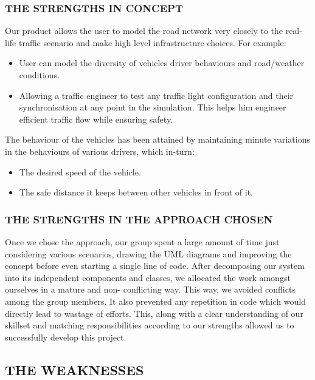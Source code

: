 \documentclass[11pt,a4paper]{article}
\begin{document}
\subsubsection{THE STRENGTHS IN CONCEPT}

Our product allows the user to model the road network very closely to the real-life traffic scenario and make high level infrastructure choices. 
For example:	
\begin{itemize}
\item User can model the diversity of vehicles driver behaviours and road/weather conditions.
\item Allowing a traffic engineer to test any traffic light configuration and their synchronisation at any point in the  simulation. This helps him engineer efficient traffic flow while ensuring safety.
\end{itemize}

The behaviour of the vehicles has been attained by maintaining minute variations in the behaviours of various drivers, which in-turn: 
\begin{itemize}
\item The desired speed of the vehicle.
\item The safe distance it keeps between other vehicles in front of it.
\end{itemize}


\subsubsection{THE STRENGTHS IN THE APPROACH CHOSEN}

Once we chose the approach, our group spent a large amount of time just considering various scenarios, drawing the UML diagrams and improving the concept before even starting a single line of code. After decomposing our system into its independent components and classes, we allocated the work amongst ourselves in a mature and non- conflicting way. This way, we avoided conflicts among the group members. It also prevented any repetition in code which would directly lead to wastage of efforts. This, along with a clear understanding of our skillset and matching responsibilities according to our strengths allowed us to successfully develop this project.

\subsection{THE WEAKNESSES}
\end{document}
